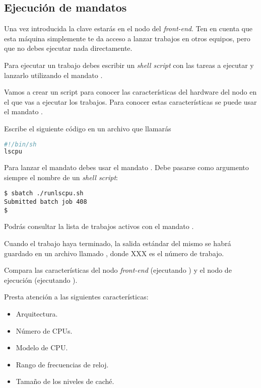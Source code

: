 \subsection{Ejecución de mandatos}

Una vez introducida la clave estarás en el nodo del \emph{front-end}.
Ten en cuenta que esta máquina simplemente te da acceso a lanzar trabajos
en otros equipos, pero que no debes ejecutar nada directamente.

Para ejecutar un trabajo debes escribir un \emph{shell script} con las tareas
a ejecutar y lanzarlo utilizando el mandato .

Vamos a crear un script para conocer las características del hardware del nodo
en el que vas a ejecutar los trabajos. Para conocer estas características
se puede usar el mandato . 

Escribe el siguiente código en un archivo que llamarás 

\begin{lstlisting}[language=bash,frame=single,title={Archivo: runlscpu.sh}]
#!/bin/sh
lscpu
\end{lstlisting}

Para lanzar el mandato debes usar el mandato .
Debe pasarse como argumento siempre el nombre de un \emph{shell script}:

\begin{lstlisting}[style=terminal]
$ sbatch ./runlscpu.sh
Submitted batch job 408
$
\end{lstlisting}

Podrás consultar la lista de trabajos activos con el mandato .

Cuando el trabajo haya terminado, la salida estándar del mismo se habrá guardado
en un archivo llamado , donde XXX es el número de trabajo.

Compara las características del nodo \emph{front-end} (ejecutando )
y el nodo de ejecución (ejecutando ).

Presta atención a las siguientes características:
\begin{itemize}
  \item Arquitectura.
  \item Número de CPUs.
  \item Modelo de CPU.
  \item Rango de frecuencias de reloj.
  \item Tamaño de los niveles de caché.
\end{itemize}

